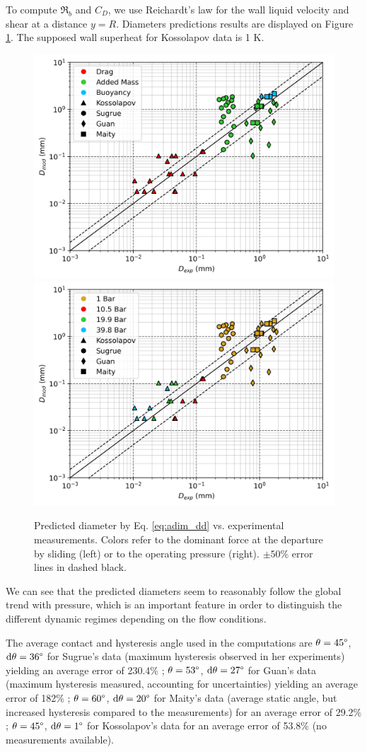 To compute $\Re_{b}$ and $C_{D}$, we use Reichardt's law\cite{Reichardt1951} for the wall liquid velocity and shear at a distance $y=R$. Diameters predictions results are displayed on Figure \ref{fig:pred_dd}. The supposed wall superheat for Kossolapov data is 1 K.

\begin{figure}[!htb]
\vspace{16pt}
\centering
\includegraphics[width=0.49\linewidth]{img/forces/pred_dd_dom.png}
\includegraphics[width=0.49\linewidth]{img/forces/pred_dd_p.png}
\caption{Predicted diameter by Eq. \ref{eq:adim_dd} vs. experimental measurements. Colors refer to the dominant force at the departure by sliding (left) or to the operating pressure (right). $\pm 50\%$ error lines in dashed black.}
\label{fig:pred_dd}
\vspace{16pt}
\end{figure}

We can see that the predicted diameters seem to reasonably follow the global trend with pressure, which is an important feature in order to distinguish the different dynamic regimes depending on the flow conditions. 

The average contact and hysteresis angle used in the computations are $\theta=45\degree$, $\mathrm{d}\theta=36\degree$ for Sugrue's data (maximum hysteresis observed in her experiments) yielding an average error of 230.4\% ; $\theta=53\degree$, $\mathrm{d}\theta=27\degree$ for Guan's data (maximum hysteresis measured, accounting for uncertainties) yielding an average error of 182\% ; $\theta=60\degree$, $\mathrm{d}\theta=20\degree$ for Maity's data (average static angle, but increased hysteresis compared to the measurements) for an average error of 29.2\% ; $\theta=45\degree$, $\mathrm{d}\theta=1\degree$ for Kossolapov's data for an average error of 53.8\% (no measurements available).

